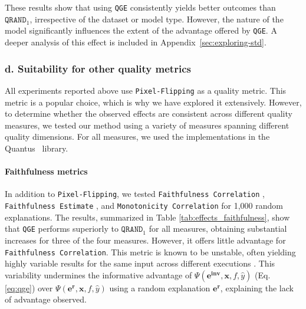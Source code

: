 These results show that using \texttt{QGE} consistently yields better outcomes than $\texttt{QRAND}_1$, irrespective of the dataset or model type. However, the nature of the model significantly influences the extent of the advantage offered by \texttt{QGE}. A deeper analysis of this effect is included in Appendix~\ref{sec:exploring-std}.

\subsubsection{d. Suitability for other quality metrics}\label{sec:suitability_for_metrics}
All experiments reported above use \texttt{Pixel-Flipping} \cite{bach2015pixel} as a quality metric. This metric is a popular choice, which is why we have explored it extensively. However, to determine whether the observed effects are consistent across different quality measures, we tested our method using a variety of measures spanning different quality dimensions. For all measures, we used the implementations in the Quantus~\cite{hedstrom2022quantus} library.

\paragraph{Faithfulness metrics}
In addition to \texttt{Pixel-Flipping}, we tested \texttt{Faithfulness Correlation} \cite{bhatt2020}, \texttt{Faithfulness Estimate} \cite{AlvarezCorr18}, and \texttt{Monotonicity Correlation} \cite{arya2019explanation} for 1,000 random explanations. The results, summarized in Table \ref{tab:effects_faithfulness}, show that \texttt{QGE} performs superiorly to $\texttt{QRAND}_1$ for all measures, obtaining substantial increases for three of the four measures. However, it offers little advantage for \texttt{Faithfulness Correlation}. This metric is known to be unstable, often yielding highly variable results for the same input across different executions \cite{tomsett2020, hedstrom2023metaquantus, hedstrom2022quantus}. This variability undermines the informative advantage of $\Psi(\mathbf{e^{inv}}, \mathbf{x}, f, \hat{y})$ (Eq. \ref{eq:qge}) over $\Psi(\mathbf{e^{r}}, \mathbf{x}, f, \hat{y})$ using a random explanation $\mathbf{e^{r}}$, explaining the lack of advantage observed.

